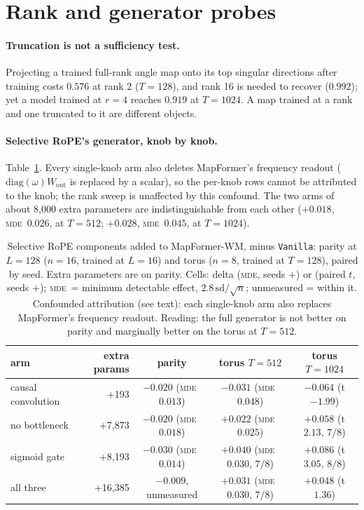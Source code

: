 \documentclass[10pt]{article}
\newcommand{\mde}{\textsc{mde}}
\newcommand{\arm}[1]{\texttt{#1}}
\begin{document}
\section{Rank and generator probes}
\label{app:rank}

\paragraph{Truncation is not a sufficiency test.} Projecting a trained full-rank angle map onto its top
singular directions after training costs $0.576$ at rank 2 ($T=128$), and rank 16 is needed to recover
($0.992$); yet a model trained at $r=4$ reaches $0.919$ at $T=1024$. A map trained at a rank and one truncated to
it are different objects. %

\paragraph{Selective RoPE's generator, knob by knob.} Table~\ref{tab:srope}. Every single-knob arm also deletes
MapFormer's frequency readout ($\mathrm{diag}(\omega)W_{\mathrm{out}}$ is replaced by a scalar), so the per-knob
rows cannot be attributed to the knob; the rank sweep is unaffected by this confound. The two arms of about
8,000 extra parameters are indistinguishable from each other ($+0.018$, \mde\ $0.026$, at $T=512$; $+0.028$, \mde\ $0.045$, at $T=1024$).

\begin{table}[h]
\centering
\small
\captionsetup{font=footnotesize,skip=4pt}
\caption{Selective RoPE components added to MapFormer-WM, minus \arm{Vanilla}: parity at $L=128$ ($n=16$, trained at $L=16$) and torus ($n=8$, trained at $T=128$), paired by seed. Extra parameters are on parity. Cells: delta (\mde, seeds $+$) or (paired $t$, seeds $+$); \mde\ = minimum detectable effect, $2.8\,\mathrm{sd}/\sqrt{n}$; unmeasured = within it. Confounded attribution (see text): each single-knob arm also replaces MapFormer's frequency readout. Reading: the full generator is not better on parity and marginally better on the torus at $T=512$.}
\label{tab:srope}
\begin{tabular}{@{}lrccc@{}}
\toprule
arm & extra params & parity & torus $T=512$ & torus $T=1024$ \\
\midrule
causal convolution & +193   & $-0.020$ (\mde\ $0.013$) & $-0.031$ (\mde\ $0.048$) & $-0.064$ (t $-1.99$) \\
no bottleneck      & +7,873 & $-0.020$ (\mde\ $0.018$) & $+0.022$ (\mde\ $0.025$) & $+0.058$ (t $2.13$, $7/8$) \\
sigmoid gate       & +8,193 & $-0.030$ (\mde\ $0.014$) & $+0.040$ (\mde\ $0.030$, $7/8$) & $+0.086$ (t $3.05$, $8/8$) \\
all three          & +16,385 & $-0.009$, unmeasured   & $+0.031$ (\mde\ $0.030$, $7/8$) & $+0.048$ (t $1.36$) \\
\bottomrule
\end{tabular}
\end{table}
\end{document}
